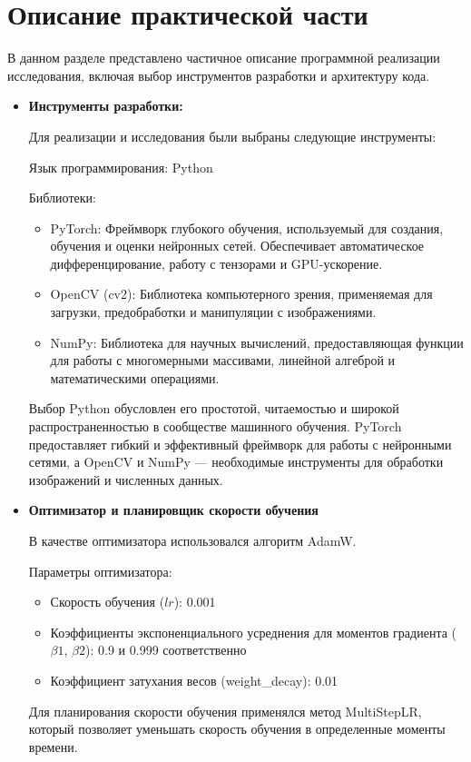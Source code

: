 \section{Описание практической части}
\label{sec:Chapter4} 

В данном разделе представлено частичное описание программной реализации исследования, включая выбор инструментов разработки и архитектуру кода.

\begin{itemize}
    \item \textbf{Инструменты разработки:}
    
    Для реализации и исследования были выбраны следующие инструменты:

    Язык программирования: Python 
    
    Библиотеки:

    \begin{itemize}
        \item PyTorch: Фреймворк глубокого обучения, используемый для создания, обучения и оценки нейронных сетей. Обеспечивает автоматическое дифференцирование, работу с тензорами и GPU-ускорение.
        \item OpenCV (cv2): Библиотека компьютерного зрения, применяемая для загрузки, предобработки и манипуляции с изображениями.
        \item NumPy: Библиотека для научных вычислений, предоставляющая функции для работы с многомерными массивами, линейной алгеброй и математическими операциями.
    \end{itemize}
    Выбор Python обусловлен его простотой, читаемостью и широкой распространенностью в сообществе машинного обучения. PyTorch предоставляет гибкий и эффективный фреймворк для работы с нейронными сетями, а OpenCV и NumPy —  необходимые инструменты для обработки изображений и численных данных. 


    \item \textbf{Оптимизатор и планировщик скорости обучения}

    В  качестве  оптимизатора  использовался  алгоритм  AdamW.  

    Параметры  оптимизатора:  
    \begin{itemize}
        \item Скорость  обучения  (\(lr\)):  0.001
        \item Коэффициенты  экспоненциального  усреднения  для  моментов  градиента  (\(\beta1\),  \(\beta2\)):  0.9  и  0.999  соответственно 
        \item Коэффициент  затухания  весов  (weight\_decay):  0.01
    \end{itemize}
    Для  планирования  скорости  обучения  применялся  метод  MultiStepLR,  который  позволяет  уменьшать  скорость  обучения  в  определенные  моменты  времени.  


\end{itemize}
